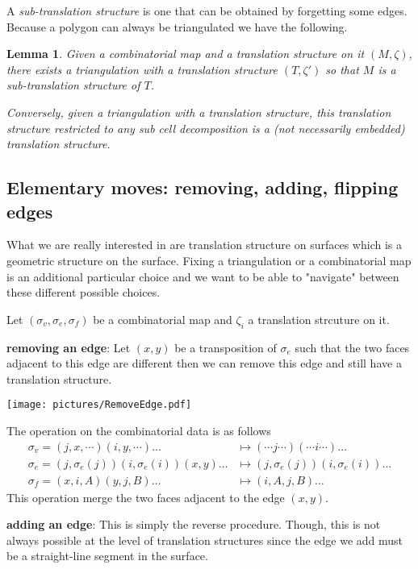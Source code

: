 \documentclass{article}
\newtheorem{lemma}[definition]{Lemma}
\begin{document}
A \emph{sub-translation structure} is one that can be obtained by forgetting
some edges. Because a polygon can always be triangulated we have the following.
\begin{lemma}
Given a combinatorial map and a translation structure on it $(M,\zeta)$, there
exists a triangulation with a translation structure $(T,\zeta')$ so that $M$ is
a sub-translation structure of $T$.

Conversely, given a triangulation with a translation structure, this translation
structure restricted to any sub cell decomposition is a (not necessarily embedded)
translation structure.
\end{lemma}

\subsection{Elementary moves: removing, adding, flipping edges}
What we are really interested in are translation structure on surfaces which
is a geometric structure on the surface. Fixing a triangulation or a combinatorial
map is an additional particular choice and we want to be able to "navigate" between
these different possible choices.

Let $(\sigma_v, \sigma_e, \sigma_f)$ be a combinatorial map and $\zeta_i$ a
translation strcuture on it.

\textbf{removing an edge}:
Let $(x,y)$ be a transposition of $\sigma_e$ such that the two faces adjacent to this
edge are different then we can remove this edge and still have a translation structure.
\begin{center}\texttt{[image: pictures/RemoveEdge.pdf]}\end{center}
The operation on the combinatorial data is as follows
\begin{align*}
\sigma_v = (j, x, \cdots) (i, y, \cdots) \ldots & \mapsto (\cdots j \cdots) (\cdots i \cdots) \ldots \\
\sigma_e = (j, \sigma_e(j)) (i, \sigma_e(i)) (x,y) \ldots & \mapsto (j, \sigma_e(j)) (i, \sigma_e(i)) \ldots \\
\sigma_f = (x,i,A) (y,j,B) \ldots & \mapsto (i,A,j,B) \ldots 
\end{align*} 
This operation merge the two faces adjacent to the edge $(x,y)$.

\textbf{adding an edge}:
This is simply the reverse procedure. Though, this is not always possible at the
level of translation structures since the edge we add must be a straight-line segment
in the surface.
\end{document}
